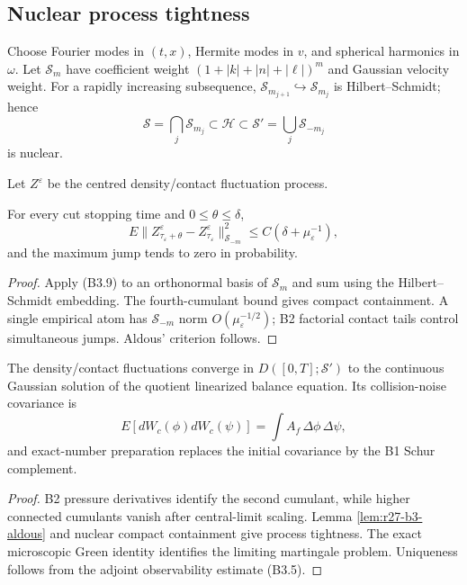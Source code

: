 \subsection{Nuclear process tightness}

Choose Fourier modes in $(t,x)$, Hermite modes in $v$, and spherical harmonics
in $\omega$.  Let $\mathcal S_m$ have coefficient weight
$(1+|k|+|n|+|\ell|)^m$ and Gaussian velocity weight.  For a rapidly increasing
subsequence, $\mathcal S_{m_{j+1}}\hookrightarrow\mathcal S_{m_j}$ is
Hilbert--Schmidt; hence
\[
 \mathcal S=\bigcap_j\mathcal S_{m_j}
 \subset\mathcal H\subset
 \mathcal S'=\bigcup_j\mathcal S_{-m_j}
\]
is nuclear.

Let $Z^\varepsilon$ be the centred density/contact fluctuation process.

\begin{lemma}
\label{lem:r27-b3-aldous}
For every cut stopping time and $0\le\theta\le\delta$,
\[
 E\|Z^\varepsilon_{\tau_\varepsilon+\theta}
      -Z^\varepsilon_{\tau_\varepsilon}\|_{\mathcal S_{-m}}^2
 \le C(\delta+\mu_\varepsilon^{-1}),                      \tag{B3.10}
\]
and the maximum jump tends to zero in probability.
\end{lemma}

\begin{proof}
Apply (B3.9) to an orthonormal basis of $\mathcal S_m$ and sum using the
Hilbert--Schmidt embedding.  The fourth-cumulant bound gives compact
containment.  A single empirical atom has
$\mathcal S_{-m}$ norm $O(\mu_\varepsilon^{-1/2})$; B2 factorial contact
tails control simultaneous jumps.  Aldous' criterion follows.
\end{proof}

\begin{theorem}
\label{thm:r27-b3-clt}
The density/contact fluctuations converge in
$D([0,T];\mathcal S')$ to the continuous Gaussian solution of the quotient
linearized balance equation.  Its collision-noise covariance is
\[
 E[dW_c(\phi)dW_c(\psi)]
 =\int A_f\,\Delta\phi\,\Delta\psi,                        \tag{B3.11}
\]
and exact-number preparation replaces the initial covariance by the B1 Schur
complement.
\end{theorem}

\begin{proof}
B2 pressure derivatives identify the second cumulant, while higher connected
cumulants vanish after central-limit scaling.  Lemma
\ref{lem:r27-b3-aldous} and nuclear compact containment give process
tightness.  The exact microscopic Green identity identifies the limiting
martingale problem.  Uniqueness follows from the adjoint observability
estimate (B3.5).
\end{proof}

